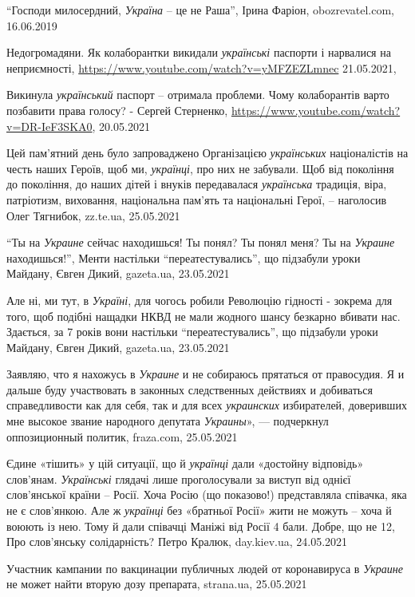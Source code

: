 \enquote{Господи милосердний, \emph{Україна} – це не Раша}, Ірина Фаріон,
obozrevatel.com, 16.06.2019

Недогромадяни. Як колаборантки викидали \emph{українські} паспорти і нарвалися
на неприємності, \url{https://www.youtube.com/watch?v=yMFZEZLmnec} 21.05.2021,

Викинула \emph{український} паспорт – отримала проблеми. Чому колаборантів
варто позбавити права голосу? - Сергей Стерненко,
\url{https://www.youtube.com/watch?v=DR-IeF3SKA0}, 20.05.2021

Цей пам'ятний день було запроваджено Організацією \emph{українських} націоналістів на
честь наших Героїв, щоб ми, \emph{українці}, про них не забували. Щоб від покоління до
покоління, до наших дітей і внуків передавалася \emph{українська} традиція, віра,
патріотизм, виховання, національна пам'ять та національні Герої, – наголосив
Олег Тягнибок, zz.te.ua, 25.05.2021

\enquote{Ты на \emph{Украине} сейчас находишься! Ты понял? Ты понял меня? Ты на
\emph{Украине} находишься!}, Менти настільки \enquote{переатестувались}, що
підзабули уроки Майдану, Євген Дикий, gazeta.ua, 23.05.2021

Але ні, ми тут, в \emph{Україні}, для чогось робили Революцію гідності - зокрема для
того, щоб подібні нащадки НКВД не мали жодного шансу безкарно вбивати нас.
Здається, за 7 років вони настільки \enquote{переатестувались}, що підзабули уроки
Майдану, Євген Дикий, gazeta.ua, 23.05.2021

Заявляю, что я нахожусь в \emph{Украине} и не собираюсь прятаться от
правосудия. Я и дальше буду участвовать в законных следственных действиях и
добиваться справедливости как для себя, так и для всех \emph{украинских}
избирателей, доверивших мне высокое звание народного депутата \emph{Украины}»,
— подчеркнул оппозиционный политик, fraza.com, 25.05.2021

Єдине «тішить» у цій ситуації, що й \emph{українці} дали «достойну відповідь»
слов'янам. \emph{Українські} глядачі лише проголосували за виступ від однієї
слов'янської країни – Росії. Хоча Росію (що показово!) представляла співачка,
яка не є слов'янкою. Але ж \emph{українці} без «братньої Росії» жити не можуть – хоча
й воюють із нею. Тому й дали співачці Маніжі від Росії 4 бали. Добре, що не 12, 
Про слов'янську солідарність? Петро Кралюк, day.kiev.ua, 24.05.2021

Участник кампании по вакцинации публичных людей от коронавируса в \emph{Украине} не
может найти вторую дозу препарата, strana.ua, 25.05.2021

